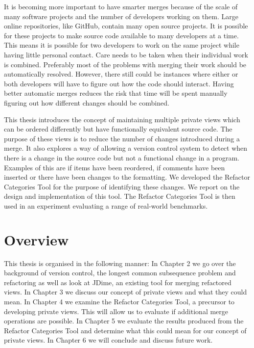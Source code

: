 It is becoming more important to have smarter merges because of the scale of many software projects and the number of developers working on them.
Large online repositories, like GitHub, contain many open source projects.
It is possible for these projects to make source code available to many developers at a time.
This means it is possible for two developers to work on the same project while having little personal contact.
Care needs to be taken when their individual work is combined.
Preferably most of the problems with merging their work should be automatically resolved. 
However, there still could be instances where either or both developers will have to figure out how the code should interact.
Having better automatic merges reduces the risk that time will be spent manually figuring out how different changes should be combined.

This thesis introduces the concept of maintaining multiple private views which can be ordered differently but have functionally equivalent source code.
The purpose of these views is to reduce the number of changes introduced during a merge. 
It also explores a way of allowing a version control system to detect when there is a change in the source code but not a functional change in a program.
Examples of this are if items have been reordered, if comments have been inserted or there have been changes to the formatting. 
We developed the Refactor Categories Tool for the purpose of identifying these changes. 
We report on the design and implementation of this tool.
The Refactor Categories Tool is then used in an experiment evaluating a range of real-world benchmarks.


% 
 

\section{Overview}
This thesis is organised in the following manner:
In Chapter 2 we go over the background of version control, the longest common subsequence problem and refactoring as well as look at JDime, an existing tool for merging refactored views.
In Chapter 3 we discuss our concept of private views and what they could mean.
In Chapter 4 we examine the Refactor Categories Tool, a precursor to developing private views.
This will allow us to evaluate if additional merge operations are possible.
In Chapter 5 we evaluate the results produced from the Refactor Categories Tool and determine what this could mean for our concept of private views.
In Chapter 6 we will conclude and discuss future work. 


